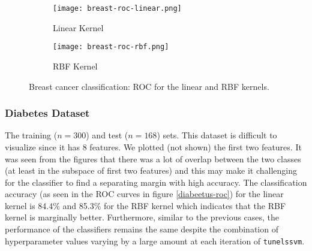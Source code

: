 \documentclass[paper=a4, fontsize=11pt]{scrartcl} %
\numberwithin{equation}{section} %
\begin{document}
\begin{figure}[ht]
\centering
	\begin{subfigure}[b]{0.5\textwidth}
		\centering
		\texttt{[image: breast-roc-linear.png]}
		\caption{Linear Kernel}
	\end{subfigure}%
	\begin{subfigure}[b]{0.5\textwidth}
		\centering
		\texttt{[image: breast-roc-rbf.png]}
		\caption{RBF Kernel}
	\end{subfigure}
\caption{Breast cancer classification: ROC for the linear and RBF kernels.}
\label{boobies-roc}
\end{figure}

\subsubsection{Diabetes Dataset}

The training ($n = 300$) and test ($n = 168$)  sets. This dataset is difficult to visualize since it has 8 features. We plotted (not shown) the first two features. It was seen from the figures that there was a lot of overlap between the two classes (at least in the subspace of first two features) and this may make it challenging for the classifier to find a separating margin with high accuracy. The classification accuracy (as seen in the ROC curves in figure \ref{diabeetus-roc}) for the linear kernel is 84.4\%  and 85.3\% for the RBF kernel which indicates that the RBF kernel is marginally better. Furthermore, similar to the previous cases, the performance of the classifiers remains the same despite the combination of hyperparameter values varying by a large amount at each iteration of \texttt{tunelssvm}.

\begin{comment}
\begin{figure}[ht]
\centering
	\begin{subfigure}[b]{0.5\textwidth}
		\centering
		\texttt{[image: diabetes-train.png]}
		\caption{Training set}
	\end{subfigure}%
	\begin{subfigure}[b]{0.5\textwidth}
		\centering
		\texttt{[image: diabetes-test.png]}
		\caption{Test set}
	\end{subfigure}
\caption{PIMA Indians Diabetes classification: Training and test data. The dimension of the feature space is 8 which can't be visualized, thus only the first two features and the corresponding class labels are plotted.}
\label{diabeetus-data}
\end{figure}
\end{comment}
\end{document}

